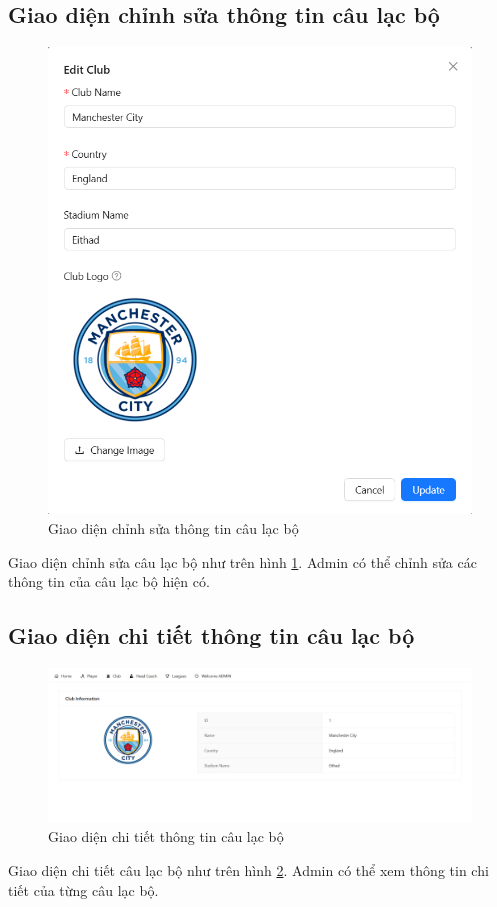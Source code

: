 \documentclass[../BTL.tex]{subfiles}
\begin{document}
\subsection{Giao diện chỉnh sửa thông tin câu lạc bộ}
\begin{figure}
    \centering
    \includegraphics[width=1\linewidth]{Hinhve/admin_edit_club.png}
    \caption{Giao diện chỉnh sửa thông tin câu lạc bộ}
    \label{fig:admin_edit_club}
\end{figure}
Giao diện chỉnh sửa câu lạc bộ như trên hình \ref{fig:admin_edit_club}. Admin có thể chỉnh sửa các thông tin của câu lạc bộ hiện có.

\subsection{Giao diện chi tiết thông tin câu lạc bộ}
\begin{figure}
    \centering  
    \includegraphics[width=1\linewidth]{Hinhve/admin_club_detail_v2.png}
    \caption{Giao diện chi tiết thông tin câu lạc bộ}
    \label{fig:admin_club_detail}
\end{figure}
Giao diện chi tiết câu lạc bộ như trên hình \ref{fig:admin_club_detail}. Admin có thể xem thông tin chi tiết của từng câu lạc bộ.
\end{document}
